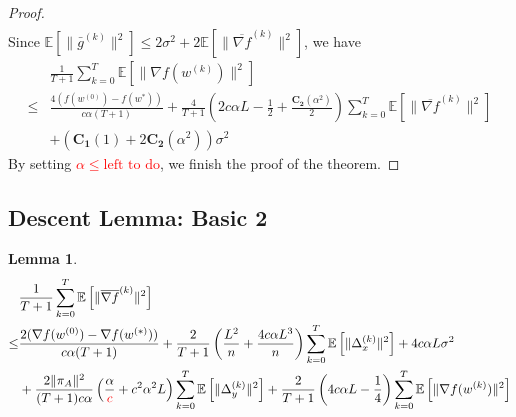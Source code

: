 \documentclass{article}
\newtheorem{lemma}[thm]{Lemma}
\newcommand{\EE}[1]{\mathbb{E}\left[#1\right]}
\newcommand{\norm}[1]{\| #1 \|}
\begin{document}
\begin{proof}
\begin{align*}
  \end{align*}
  Since $\EE{\norm{\bar{g}^{(k)}}^2}\leq 2\sigma^2+2\EE{\norm{\overline{\nabla f}^{(k)}}^2}$, we have 
  \begin{align*}
    &\frac{1}{T+1}\sum_{k=0}^T\EE{\norm{\nabla f(w^{(k)})}^2}\\ 
  \leq & \frac{4(f(w^{(0)})-f(w^{*}))}{c\alpha(T+1)}+\frac{4}{T+1}\left(2c\alpha L-\frac{1}{2}+\frac{\mathbf{C_2}(\alpha^2)}{2}\right)\sum_{k=0}^T\EE{\norm{\overline{\nabla f}^{(k)}}^2}\\&+\left(\mathbf{C_1}(1)+2\mathbf{C_2}(\alpha^2)\right)\sigma^2
  \end{align*}
  By setting \textcolor{red}{$\alpha \leq \text{left to do}$}, we finish the proof of the theorem.
\end{proof}

\subsection{Descent Lemma: Basic 2}
\begin{lemma}
  \begin{align*}
    &\frac{1}{T+1}\sum_{k=0}^T\EE{\norm{\overline{\nabla f}^{(k)}}^2}\\ \leq& \frac{2(\nabla f(w^{(0)})-\nabla f(w^{(*)}))}{c\alpha(T+1)}+\frac{2}{T+1}\left(\frac{L^2}{n}+\frac{4c\alpha L^3}{n}\right)\sum_{k=0}^T\EE{\norm{\Delta_x^{(k)}}^2}+4c\alpha L\sigma^2\\&+\frac{2\norm{\pi_A}^2}{(T+1)c\alpha}\left(\frac{\alpha}{\textcolor{red}{c}}+c^2\alpha^2L\right)\sum_{k=0}^T\EE{\norm{\Delta_{y}^{(k)}}^2}+\frac{2}{T+1}\left(4c\alpha L-\frac{1}{4}\right)\sum_{k=0}^T\EE{\norm{\nabla f(w^{(k)})}^2}
  \end{align*}
\end{lemma}
\end{document}
